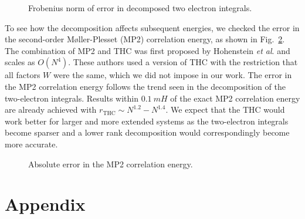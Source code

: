 %
\begin{figure}[tb]
\caption{Frobenius norm of error in decomposed two electron integrals.
\label{fig:thc_err_mo_3systems}}
\end{figure}
%
To see how the decomposition affects subsequent energies, we checked
the error in the second-order M{\o}ller-Plesset (MP2) correlation
energy, as shown in Fig.~\ref{fig:mp2_err_ao_full}.  The combination
of MP2 and THC was first proposed by Hohenstein \emph{et
al}.\cite{hohenstein_thc2} and scales as $O(N^4)$.  These authors used
a version of THC with the restriction that all factors $W$ were the
same, which we did not impose in our work. 
The error in the MP2 correlation energy follows the trend seen in the
decomposition of the two-electron integrals.  Results within $0.1~mH$
of the exact MP2 correlation energy are already achieved with
$r_\mathrm{THC} \sim N^{1.2} - N^{1.4}$.  We expect that the THC would
work better for larger and more extended systems as the two-electron
integrals become sparser and a lower rank decomposition would
correspondingly become more accurate.
%
\begin{figure}[tb]
\caption{Absolute error in the MP2 correlation energy.
\label{fig:mp2_err_ao_full}}
\end{figure}
%

\section{Appendix}
\label{sec:Appendix} 